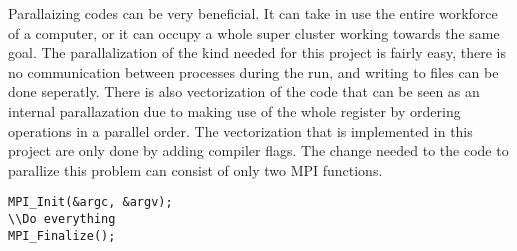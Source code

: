 %
Parallaizing codes can be very beneficial. It can take in use the entire workforce
of a computer, or it can occupy a whole super cluster working towards the same goal.
The parallalization of the kind needed for this project is fairly easy, there is no
communication between processes during the run, and writing to files can be done
seperatly. There is also vectorization of the code that can be seen as an 
internal parallazation due to making use of the whole register by ordering operations
in a parallel order. The vectorization that is implemented in this project are 
only done by adding compiler flags.
The change needed to the code to parallize this problem can consist of only two MPI functions.
\begin{lstlisting}[linewidth=5.5cm,frame=single]
MPI_Init(&argc, &argv);
\\Do everything
MPI_Finalize();
\end{lstlisting}

%
